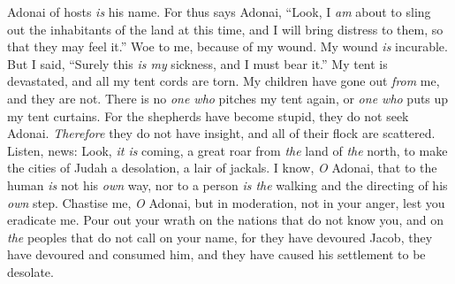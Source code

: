 \begin{biblechapter}
Adonai of hosts \textit{is} his name.
\verse For thus says Adonai, “Look, I \textit{am} about to sling out the inhabitants of the land at this time, 
and I will bring distress to them, so that they may feel it.”
 Woe to me, because of my wound. 
My wound \textit{is} incurable. 
But I said, “Surely this \textit{is my} sickness, 
and I must bear it.”
\verse My tent is devastated, 
and all my tent cords are torn. 
My children have gone out \textit{from} me, 
and they are not. 
There is no \textit{one who} pitches my tent again, 
or \textit{one who} puts up my tent curtains.
\verse For the shepherds have become stupid, 
they do not seek Adonai. 
\textit{Therefore} they do not have insight, 
and all of their flock are scattered.
\verse Listen, news: 
Look, \textit{it is} coming, 
a great roar from \textit{the} land of \textit{the} north, 
to make the cities of Judah a desolation, 
a lair of jackals.
\verse I know, \textit{O} Adonai, that to the human \textit{is} not his \textit{own} way, 
nor to a person \textit{is the} walking and the directing of his \textit{own} step.
\verse Chastise me, \textit{O} Adonai, but in moderation, 
not in your anger, lest you eradicate me.
\verse Pour out your wrath on the nations that do not know you, 
and on \textit{the} peoples that do not call on your name, 
for they have devoured Jacob, 
they have devoured and consumed him, 
and they have caused his settlement to be desolate.
\end{biblechapter}

